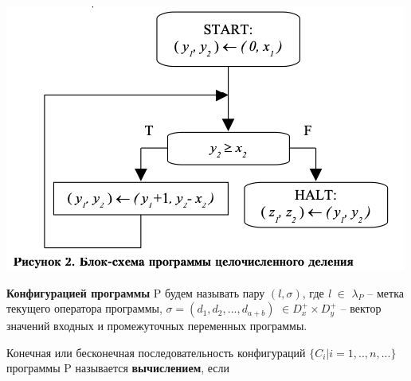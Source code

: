 \includegraphics[scale=0.5]{pics/block_scheme.png}

\textbf{Конфигурацией программы} P будем называть пару $( \textit{l}, \sigma )$, где \textit{l} $\in$ $\lambda_P$ -- метка текущего оператора программы, $\sigma = (d_1,d_2,...,d_{a+b} )$ $\in D_x^+ \times D_y^+$ -- вектор значений входных и промежуточных переменных программы.


Конечная или бесконечная последовательность конфигураций $\{ C_i | i=1,..,n,...\}$ программы P называется \textbf{вычислением}, если

